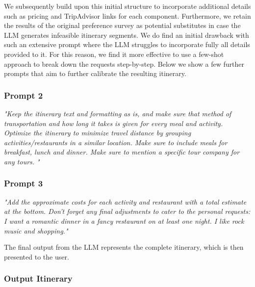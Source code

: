 \documentclass[12pt,a4paper]{report}
\begin{document}
We subsequently build upon this initial structure to incorporate additional details such as pricing and TripAdvisor links for each component.  Furthermore, we retain the results of the original preference survey as potential substitutes in case the LLM generates infeasible itinerary segments. We do find an initial drawback with such an extensive prompt where the LLM struggles to incorporate fully all details provided to it. For this reason, we find it more effective to use a few-shot approach to break down the requests step-by-step. Below we show a few further prompts that aim to further calibrate the resulting itinerary.

\subsubsection{Prompt 2}
\textit{"Keep the itinerary text and formatting as is, and make sure that method of transportation and how long it takes is given for every meal and activity. Optimize the itinerary to minimize travel distance by grouping activities/restaurants in a similar location. Make sure to include meals for breakfast, lunch and dinner. Make sure to mention a specific tour company for any tours. "}

\subsubsection{Prompt 3}
\textit{"Add the approximate costs for each activity and restaurant with a total estimate at the bottom. Don't forget any final adjustments to cater to the personal requests: I want a romantic dinner in a fancy restaurant on at least one night. I like rock music and shopping."}

The final output from the LLM represents the complete itinerary, which is then presented to the user.

\subsubsection{Output Itinerary}
\end{document}
